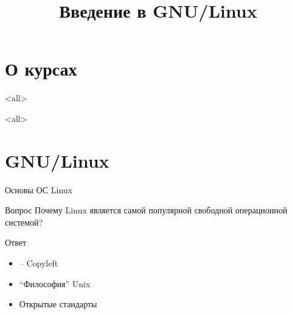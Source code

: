 

\title{Введение в GNU/Linux}





\begin{frame}
	\frametitle{}
	\titlepage
	\vspace{-0.5cm}
	\begin{center}
	\end{center}
\end{frame}


\begin{frame}
	\tableofcontents
	[hideallsubsections]
\end{frame}

\section{О курсах}

\mode<all>{}

\mode<all>{}

\section*{GNU/Linux}

\begin{frame}{Основы ОС Linux}

	\begin{block}{Вопрос}
	Почему Linux является самой популярной
	свободной операционной системой?
	\end{block}

	\pause

	\begin{block}{Ответ}
	\begin{itemize}
		\item \textcopyleft -- Copyleft
		\item ``Философия'' Unix
		\item Открытые стандарты
	\end{itemize}
	\end{block}

\end{frame}



